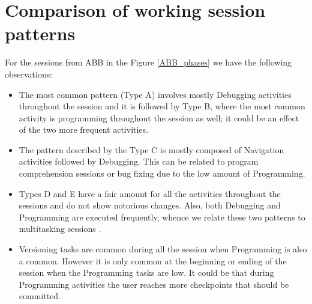 \section{Comparison of working session patterns}


For the sessions from ABB in the Figure \ref{ABB_phases} we have the following observations:
\begin{itemize}
	\item The most common pattern (Type A) involves mostly Debugging activities throughout the session and it is followed by Type B, where the most common activity is programming throughout the session as well; it could be an effect of the two more frequent activities.
	
	\item The pattern described by the Type C is mostly composed of Navigation activities followed by Debugging. This can be related to program comprehension sessions \cite{MMLK14} or bug fixing due to the low amount of Programming.
	
	\item Types D and E have a fair amount for all the activities throughout the sessions and do not show notorious changes. Also, both Debugging and Programming are executed frequently, whence we relate these two patterns to multitasking sessions \cite{SLV10}.
	
	\item Versioning tasks are common during all the session when Programming is also a common. However it is only common at the beginning or ending of the session when the Programming tasks are low. It could be that during Programming activities the user reaches more checkpoints that should be committed. 
\end{itemize}

